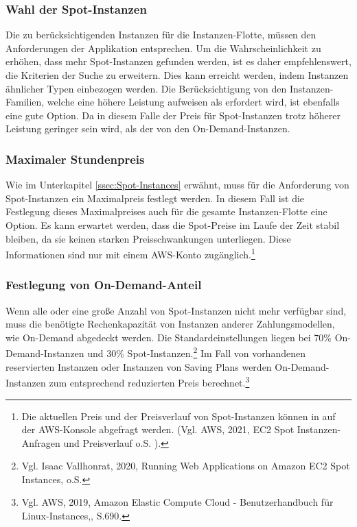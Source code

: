 \subsubsection*{Wahl der Spot-Instanzen}
Die zu berücksichtigenden Instanzen für die Instanzen-Flotte, müssen den Anforderungen der %
Applikation entsprechen. Um die Wahrscheinlichkeit zu erhöhen, dass mehr Spot-Instanzen gefunden werden, ist es daher empfehlenswert, die Kriterien der Suche zu erweitern. Dies kann erreicht werden, indem Instanzen ähnlicher Typen einbezogen werden. Die Berücksichtigung von den Instanzen-Familien, welche eine höhere Leistung aufweisen als erfordert wird, ist ebenfalls eine gute Option. Da in diesem Falle der Preis für Spot-Instanzen trotz höherer Leistung geringer sein wird, als der von den On-Demand-Instanzen\cite{AMZ24}. 

\subsubsection*{Maximaler Stundenpreis}
Wie im Unterkapitel \ref{ssec:Spot-Instances} erwähnt, muss für die Anforderung von Spot-Instanzen ein Maximalpreis festlegt werden. In diesem Fall ist die Festlegung dieses Maximalpreises auch für die gesamte Instanzen-Flotte eine Option. Es kann erwartet werden, dass die Spot-Preise im Laufe der Zeit stabil bleiben, da sie keinen starken Preisschwankungen unterliegen. Diese Informationen sind nur mit einem AWS-Konto zugänglich.\footnote{Die aktuellen Preis und der Preisverlauf von Spot-Instanzen können in auf der AWS-Konsole abgefragt werden. (Vgl. AWS, 2021, EC2 Spot Instanzen-Anfragen und Preisverlauf o.S. \cite{AMZ25}).}

\subsubsection*{Festlegung von On-Demand-Anteil}
Wenn alle oder eine große Anzahl von Spot-Instanzen nicht mehr verfügbar sind, muss die benötigte Rechenkapazität von Instanzen anderer Zahlungsmodellen, wie On-Demand abgedeckt werden. Die Standardeinstellungen liegen bei 70\% On-Demand-Instanzen und 30\% Spot-Instanzen.\footnote{Vgl. Isaac Vallhonrat, 2020, Running Web Applications on Amazon EC2 Spot Instances, o.S.\cite{AMZ24}} Im Fall von vorhandenen reservierten Instanzen oder Instanzen von Saving Plans werden On-Demand-Instanzen zum entsprechend reduzierten Preis berechnet.\footnote{Vgl. AWS, 2019, Amazon Elastic Compute Cloud - Benutzerhandbuch für Linux-Instances,, S.690\cite{AMZ26}.}

